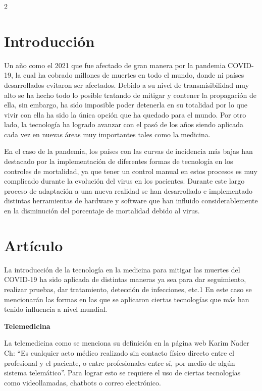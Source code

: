 \documentclass[12pt,spanish,Letterpaper,openany]{book}
\begin{document}
\begin {multicols}{2}

\hypertarget{introducciuxf3n-2}{%
\section{Introducción}\label{introducciuxf3n-2}}

Un año como el 2021 que fue afectado de gran manera por la pandemia COVID-19, la cual ha
cobrado millones de muertes en todo el mundo, donde ni países desarrollados evitaron ser
afectados. Debido a su nivel de transmisibilidad muy alto se ha hecho todo lo posible tratando de
mitigar y contener la propagación de ella, sin embargo, ha sido imposible poder detenerla en su
totalidad por lo que vivir con ella ha sido la única opción que ha quedado para el mundo. Por otro
lado, la tecnología ha logrado avanzar con el pasó de los años siendo aplicada cada vez en nuevas
áreas muy importantes tales como la medicina.

En el caso de la pandemia, los países con las curvas de incidencia más bajas han destacado por
la implementación de diferentes formas de tecnología en los controles de mortalidad, ya que tener
un control manual en estos procesos es muy complicado durante la evolución del virus en los
pacientes. Durante este largo proceso de adaptación a una nueva realidad se han desarrollado e
implementado distintas herramientas de hardware y software que han influido considerablemente
en la disminución del porcentaje de mortalidad debido al virus.

\hypertarget{artuxedculo-4}{%
\section{Artículo}\label{artuxedculo-4}}

La introducción de la tecnología en la medicina para mitigar las muertes del COVID-19 ha sido
aplicada de distintas maneras ya sea para dar seguimiento, realizar pruebas, dar tratamiento,
detección de infecciones, etc.1 En este caso se mencionarán las formas en las que se aplicaron
ciertas tecnologías que más han tenido influencia a nivel mundial.

\textbf{Telemedicina}

La telemedicina como se menciona su definición en la página web Karim Nader Ch: ``Es cualquier
acto médico realizado sin contacto físico directo entre el profesional y el paciente, o entre
profesionales entre sí, por medio de algún sistema telemático''. Para lograr esto se requiere el uso
de ciertas tecnologías como videollamadas, chatbots o correo electrónico.


\end{multicols}
\end{document}

